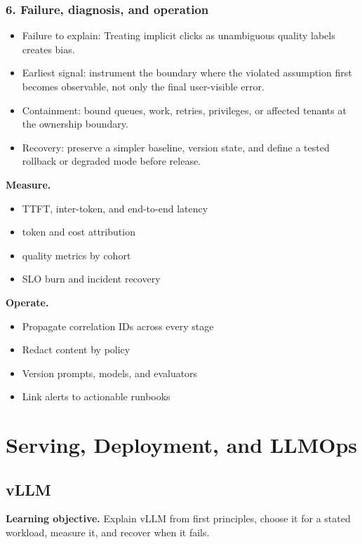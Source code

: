 \subsubsection*{6. Failure, diagnosis, and operation}
\begin{itemize}
\item Failure to explain: Treating implicit clicks as unambiguous quality labels creates bias.
\item Earliest signal: instrument the boundary where the violated assumption first becomes observable, not only the final user-visible error.
\item Containment: bound queues, work, retries, privileges, or affected tenants at the ownership boundary.
\item Recovery: preserve a simpler baseline, version state, and define a tested rollback or degraded mode before release.
\end{itemize}
\textbf{Measure.}\begin{itemize}
\item TTFT, inter-token, and end-to-end latency
\item token and cost attribution
\item quality metrics by cohort
\item SLO burn and incident recovery
\end{itemize}
\textbf{Operate.}\begin{itemize}
\item Propagate correlation IDs across every stage
\item Redact content by policy
\item Version prompts, models, and evaluators
\item Link alerts to actionable runbooks
\end{itemize}
\clearpage\section{Serving, Deployment, and LLMOps}
\subsection{vLLM}
\textbf{Learning objective.} Explain vLLM from first principles, choose it for a stated workload, measure it, and recover when it fails.
